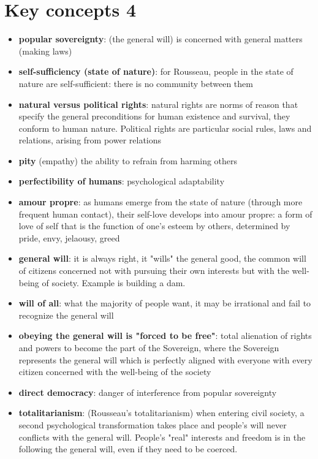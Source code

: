 \section{Key concepts 4}

\begin{itemize}
	\item \textbf{popular sovereignty}: (the general will) is concerned
	 with general matters (making laws)
	\item \textbf{self-sufficiency (state of nature)}: for Rousseau, people
	 in the state of nature are self-sufficient: there is no community
	 between them
	\item \textbf{natural versus political rights}: natural rights are
	 norms of reason that specify the general preconditions for human
	 existence and survival, they conform to human nature. Political rights
	 are particular social rules, laws and relations, arising from power
	 relations
	\item \textbf{pity} (empathy) the ability to refrain from harming
	 others
	\item \textbf{perfectibility of humans}: psychological adaptability
	\item \textbf{amour propre}: as humans emerge from the state of nature
	 (through more frequent human contact), their self-love develops into
	 amour propre: a form of love of self that is the function of one's
	 esteem by others, determined by pride, envy, jelaousy, greed
	\item \textbf{general will}: it is always right, it "wills" the
	 general good, the common will of citizens concerned not with pursuing
	 their own interests but with the well-being of society. Example is
	 building a dam.
	\item \textbf{will of all}: what the majority of people want, it may
	 be irrational and fail to recognize the general will
	\item \textbf{obeying the general will is "forced to be free"}: total
	 alienation of rights and powers to become the part of the Sovereign,
	 where the Sovereign represents the general will which is perfectly
	 aligned with everyone with every citizen concerned with the well-being
	 of the society
	\item \textbf{direct democracy}: danger of interference from popular
	 sovereignty
	\item \textbf{totalitarianism}: (Rousseau's totalitarianism) when
	 entering civil society, a second psychological transformation takes
	 place and people's will never conflicts with the general will.
	 People's "real" interests and freedom is in the following the general
	 will, even if they need to be coerced.
\end{itemize}
